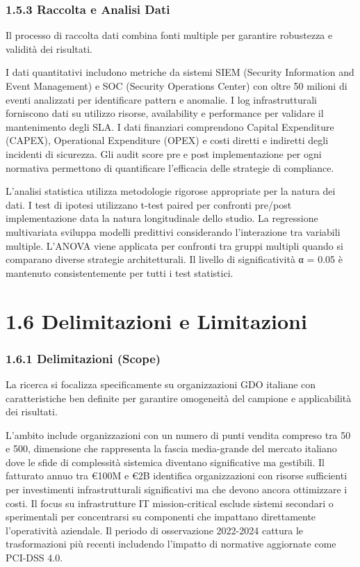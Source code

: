 \documentclass{report}
\begin{document}
\subsubsection{\texorpdfstring{\textbf{1.5.3 Raccolta e Analisi
Dati}}{1.5.3 Raccolta e Analisi Dati}}\label{raccolta-e-analisi-dati}

Il processo di raccolta dati combina fonti multiple per garantire
robustezza e validità dei risultati.

I dati quantitativi includono metriche da sistemi SIEM (Security
Information and Event Management) e SOC (Security Operations Center) con
oltre 50 milioni di eventi analizzati per identificare pattern e
anomalie. I log infrastrutturali forniscono dati su utilizzo risorse,
availability e performance per validare il mantenimento degli SLA. I
dati finanziari comprendono Capital Expenditure (CAPEX), Operational
Expenditure (OPEX) e costi diretti e indiretti degli incidenti di
sicurezza. Gli audit score pre e post implementazione per ogni normativa
permettono di quantificare l'efficacia delle strategie di compliance.

L'analisi statistica utilizza metodologie rigorose appropriate per la
natura dei dati. I test di ipotesi utilizzano t-test paired per
confronti pre/post implementazione data la natura longitudinale dello
studio. La regressione multivariata sviluppa modelli predittivi
considerando l'interazione tra variabili multiple. L'ANOVA viene
applicata per confronti tra gruppi multipli quando si comparano diverse
strategie architetturali. Il livello di significatività α = 0.05 è
mantenuto consistentemente per tutti i test statistici.

\section{\texorpdfstring{\textbf{1.6 Delimitazioni e
Limitazioni}}{1.6 Delimitazioni e Limitazioni}}\label{delimitazioni-e-limitazioni}

\subsubsection{\texorpdfstring{\textbf{1.6.1 Delimitazioni
(Scope)}}{1.6.1 Delimitazioni (Scope)}}\label{delimitazioni-scope}

La ricerca si focalizza specificamente su organizzazioni GDO italiane
con caratteristiche ben definite per garantire omogeneità del campione e
applicabilità dei risultati.

L'ambito include organizzazioni con un numero di punti vendita compreso
tra 50 e 500, dimensione che rappresenta la fascia media-grande del
mercato italiano dove le sfide di complessità sistemica diventano
significative ma gestibili. Il fatturato annuo tra €100M e €2B
identifica organizzazioni con risorse sufficienti per investimenti
infrastrutturali significativi ma che devono ancora ottimizzare i costi.
Il focus su infrastrutture IT mission-critical esclude sistemi secondari
o sperimentali per concentrarsi su componenti che impattano direttamente
l'operatività aziendale. Il periodo di osservazione 2022-2024 cattura le
trasformazioni più recenti includendo l'impatto di normative aggiornate
come PCI-DSS 4.0.
\end{document}
